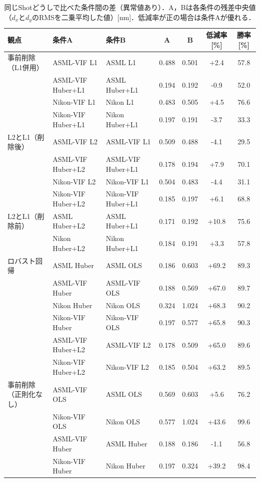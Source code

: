 \documentclass[11pt,a4paper]{ltjsarticle}
\begin{document}
\begin{table}[tb]
  \centering
  \caption{同じShotどうしで比べた条件間の差（異常値あり）．A，Bは各条件の残差中央値（$d_x$と$d_y$のRMSを二乗平均した値）[nm]．低減率が正の場合は条件Aが優れる．}
  \label{tab:comparison}
  \footnotesize
  \setlength{\tabcolsep}{3pt}
  \begin{tabular}{lllcccc}
    \toprule
    観点 & 条件A & 条件B & A & B & 低減率[\%] & 勝率[\%] \\
    \midrule
    事前削除（L1併用） & ASML-VIF L1 & ASML L1 & 0.488 & 0.501 & +2.4 & 57.8 \\
     & ASML-VIF Huber+L1 & ASML Huber+L1 & 0.194 & 0.192 & -0.9 & 52.0 \\
     & Nikon-VIF L1 & Nikon L1 & 0.483 & 0.505 & +4.5 & 76.6 \\
     & Nikon-VIF Huber+L1 & Nikon Huber+L1 & 0.197 & 0.191 & -3.7 & 33.3 \\
    \midrule
    L2とL1（削除後） & ASML-VIF L2 & ASML-VIF L1 & 0.509 & 0.488 & -4.1 & 29.5 \\
     & ASML-VIF Huber+L2 & ASML-VIF Huber+L1 & 0.178 & 0.194 & +7.9 & 70.1 \\
     & Nikon-VIF L2 & Nikon-VIF L1 & 0.504 & 0.483 & -4.4 & 31.1 \\
     & Nikon-VIF Huber+L2 & Nikon-VIF Huber+L1 & 0.185 & 0.197 & +6.1 & 68.8 \\
    \midrule
    L2とL1（削除前） & ASML Huber+L2 & ASML Huber+L1 & 0.171 & 0.192 & +10.8 & 75.6 \\
     & Nikon Huber+L2 & Nikon Huber+L1 & 0.184 & 0.191 & +3.3 & 57.8 \\
    \midrule
    ロバスト回帰 & ASML Huber & ASML OLS & 0.186 & 0.603 & +69.2 & 89.3 \\
     & ASML-VIF Huber & ASML-VIF OLS & 0.188 & 0.569 & +67.0 & 89.7 \\
     & Nikon Huber & Nikon OLS & 0.324 & 1.024 & +68.3 & 90.2 \\
     & Nikon-VIF Huber & Nikon-VIF OLS & 0.197 & 0.577 & +65.8 & 90.3 \\
     & ASML-VIF Huber+L2 & ASML-VIF L2 & 0.178 & 0.509 & +65.0 & 89.6 \\
     & Nikon-VIF Huber+L2 & Nikon-VIF L2 & 0.185 & 0.504 & +63.2 & 89.5 \\
    \midrule
    事前削除（正則化なし） & ASML-VIF OLS & ASML OLS & 0.569 & 0.603 & +5.6 & 76.2 \\
     & Nikon-VIF OLS & Nikon OLS & 0.577 & 1.024 & +43.6 & 99.6 \\
     & ASML-VIF Huber & ASML Huber & 0.188 & 0.186 & -1.1 & 56.8 \\
     & Nikon-VIF Huber & Nikon Huber & 0.197 & 0.324 & +39.2 & 98.4 \\
    \bottomrule
  \end{tabular}
\end{table}
\end{document}
